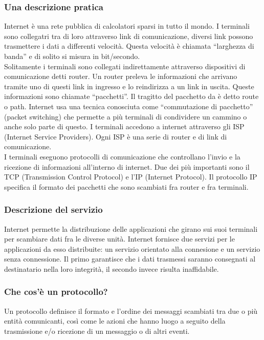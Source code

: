 \documentclass[11pt,a4paper]{article}
\begin{document}
\subsubsection{Una descrizione pratica}
Internet è una rete pubblica di calcolatori sparsi in tutto il mondo. I terminali sono collegatri tra di loro attraverso link di comunicazione, diversi link possono trasmettere i dati a differenti velocità. Questa velocità è chiamata “larghezza di banda” e di solito si misura in bit/secondo. \\
Solitamente i terminali sono collegati indirettamente attraverso dispositivi di comunicazione detti router. Un router preleva le informazioni che arrivano tramite uno di questi link in ingresso e lo reindirizza a un link in uscita. Queste informazioni sono chiamate “pacchetti”. Il tragitto del pacchetto da è detto route o path. Internet usa una tecnica conosciuta come “commutazione di pacchetto” (packet switching) che permette a più terminali di condividere un cammino o anche solo parte di questo.
I terminali accedono a internet attraverso gli ISP (Internet Service Providers). Ogni ISP è una serie di router e di link di comunicazione. \\
I terminali eseguono protocolli di comunicazione che controllano l’invio e la ricezione di informazioni all’interno di internet. Due dei più importanti sono il TCP (Transmission Control Protocol) e l’IP (Internet Protocol). Il protocollo IP specifica il formato dei pacchetti che sono scambiati fra router e fra terminali.

\subsubsection{Descrizione del servizio}
Internet permette la distribuzione delle applicazioni che girano sui suoi terminali per scambiare dati fra le diverse unità.
Internet fornisce due servizi per le applicazioni da esso distribuite: un servizio orientato alla connesione e un servizio senza connessione. Il primo garantisce che i dati trasmessi saranno consegnati al destinatario nella loro integrità, il secondo invece risulta inaffidabile.

\subsubsection{Che cos'è un protocollo?}
Un protocollo definisce il formato e l’ordine dei messaggi scambiati tra due o più entità comunicanti, così come le azioni che hanno luogo a seguito della trasmissione e/o ricezione di un messaggio o di altri eventi.
\end{document}

